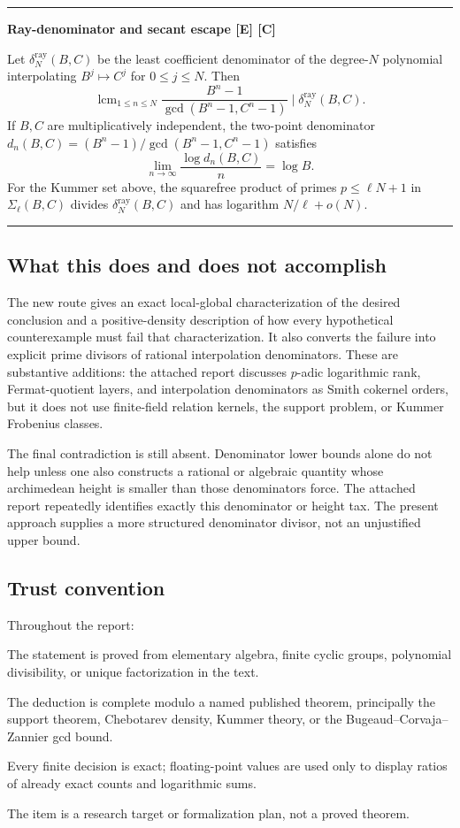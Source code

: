 \documentclass[11pt]{article}
\theoremstyle{definition}
\newcommand{\raydelta}{\delta^{\mathrm{ray}}}
\newcommand{\statusE}{\textcolor{deepgreen}{\textbf{[E]}}}
\newcommand{\statusC}{\textcolor{deepblue}{\textbf{[C]}}}
\newcommand{\statusD}{\textcolor{deepred}{\textbf{[D]}}}
\newcommand{\statusP}{\textcolor{orange!70!black}{\textbf{[P]}}}
\newenvironment{resultbox}[1]
{\begin{center}\begin{minipage}{0.94\textwidth}\hrule\vspace{0.45em}\textbf{#1}\par\vspace{0.25em}}
{\vspace{0.35em}\hrule\end{minipage}\end{center}}
\begin{document}
\begin{resultbox}{Ray-denominator and secant escape \statusE{} \statusC}
Let $\raydelta_N(B,C)$ be the least coefficient denominator of the degree-$N$ polynomial
interpolating $B^j\mapsto C^j$ for $0\le j\le N$.  Then
\[
 \operatorname{lcm}_{1\le n\le N}
 \frac{B^n-1}{\gcd(B^n-1,C^n-1)}
 \mid \raydelta_N(B,C).
\]
If $B,C$ are multiplicatively independent, the two-point denominator
$d_n(B,C)=(B^n-1)/\gcd(B^n-1,C^n-1)$ satisfies
\[
 \lim_{n\to\infty}\frac{\log d_n(B,C)}n=\log B.
\]
For the Kummer set above, the squarefree product of primes
$p\le\ell N+1$ in $\Sigma_\ell(B,C)$ divides $\raydelta_N(B,C)$ and has logarithm
$N/\ell+o(N)$.
\end{resultbox}

\subsection{What this does and does not accomplish}

The new route gives an exact local-global characterization of the desired conclusion and a
positive-density description of how every hypothetical counterexample must fail that
characterization.  It also converts the failure into explicit prime divisors of rational
interpolation denominators.  These are substantive additions: the attached report discusses
$p$-adic logarithmic rank, Fermat-quotient layers, and interpolation denominators as Smith
cokernel orders, but it does not use finite-field relation kernels, the support problem, or
Kummer Frobenius classes.

The final contradiction is still absent.  Denominator lower bounds alone do not help unless
one also constructs a rational or algebraic quantity whose archimedean height is smaller than
those denominators force.  The attached report repeatedly identifies exactly this denominator
or height tax.  The present approach supplies a more structured denominator divisor, not an
unjustified upper bound.

\subsection{Trust convention}

Throughout the report:
\begin{description}[leftmargin=1.2cm,style=nextline]
\item[\statusE] The statement is proved from elementary algebra, finite cyclic groups,
polynomial divisibility, or unique factorization in the text.
\item[\statusC] The deduction is complete modulo a named published theorem, principally the
support theorem, Chebotarev density, Kummer theory, or the Bugeaud--Corvaja--Zannier gcd bound.
\item[\statusD] Every finite decision is exact; floating-point values are used only to display
ratios of already exact counts and logarithmic sums.
\item[\statusP] The item is a research target or formalization plan, not a proved theorem.
\end{description}
\end{document}
